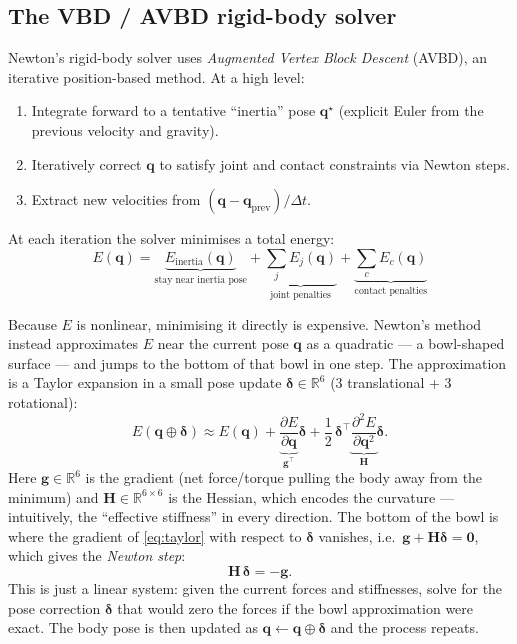 \documentclass[11pt,a4paper]{article}
\begin{document}
\subsection{The VBD / AVBD rigid-body solver}

Newton's rigid-body solver uses \emph{Augmented Vertex Block Descent}
(AVBD), an iterative position-based method.  At a high level:

\begin{enumerate}[nosep]
  \item Integrate forward to a tentative ``inertia'' pose $\mathbf{q}^\star$
        (explicit Euler from the previous velocity and gravity).
  \item Iteratively correct $\mathbf{q}$ to satisfy joint and contact
        constraints via Newton steps.
  \item Extract new velocities from $(\mathbf{q} - \mathbf{q}_\text{prev})/\Delta t$.
\end{enumerate}

At each iteration the solver minimises a total energy:
\begin{equation}
  E(\mathbf{q}) = \underbrace{E_\text{inertia}(\mathbf{q})}_{\text{stay near
  inertia pose}} + \underbrace{\sum_j E_j(\mathbf{q})}_{\text{joint penalties}}
  + \underbrace{\sum_c E_c(\mathbf{q})}_{\text{contact penalties}}
  \label{eq:energy}
\end{equation}

Because $E$ is nonlinear, minimising it directly is expensive.  Newton's
method instead approximates $E$ near the current pose $\mathbf{q}$ as a
quadratic — a bowl-shaped surface — and jumps to the bottom of that bowl in
one step.  The approximation is a Taylor expansion in a small pose update
$\boldsymbol{\delta} \in \mathbb{R}^6$ (3 translational + 3 rotational):
\begin{equation}
  E(\mathbf{q} \oplus \boldsymbol{\delta})
  \approx E(\mathbf{q})
  + \underbrace{\frac{\partial E}{\partial \mathbf{q}}}_{\mathbf{g}^\top}
    \boldsymbol{\delta}
  + \frac{1}{2}\,\boldsymbol{\delta}^\top
    \underbrace{\frac{\partial^2 E}{\partial \mathbf{q}^2}}_{\mathbf{H}}
    \boldsymbol{\delta}.
  \label{eq:taylor}
\end{equation}
Here $\mathbf{g} \in \mathbb{R}^6$ is the gradient (net force/torque pulling
the body away from the minimum) and $\mathbf{H} \in \mathbb{R}^{6\times 6}$
is the Hessian, which encodes the curvature — intuitively, the
``effective stiffness'' in every direction.  The bottom of the bowl is where
the gradient of \eqref{eq:taylor} with respect to $\boldsymbol{\delta}$
vanishes, i.e.\ $\mathbf{g} + \mathbf{H}\boldsymbol{\delta} = \mathbf{0}$,
which gives the \emph{Newton step}:
\begin{equation}
  \mathbf{H}\,\boldsymbol{\delta} = -\mathbf{g}.
  \label{eq:newton_step}
\end{equation}
This is just a linear system: given the current forces and stiffnesses, solve
for the pose correction $\boldsymbol{\delta}$ that would zero the forces if
the bowl approximation were exact.  The body pose is then updated as
$\mathbf{q} \leftarrow \mathbf{q} \oplus \boldsymbol{\delta}$ and the process
repeats.
\end{document}
